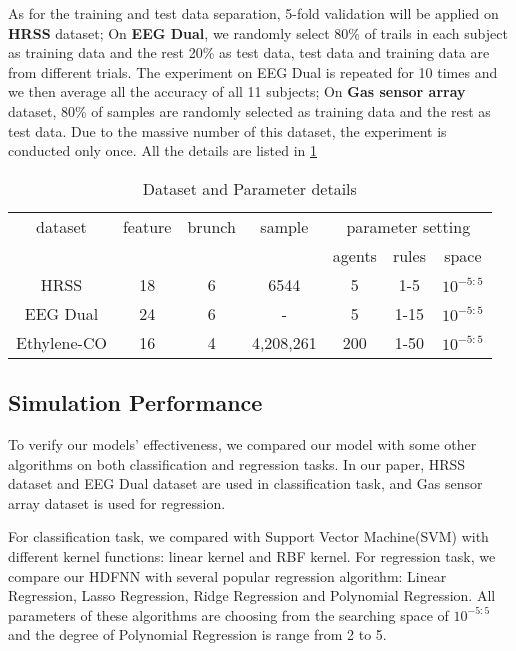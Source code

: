 \documentclass[journal,twocolumn,10pt]{IEEEtran}
\begin{document}
As for the training and test data separation, 5-fold validation will be applied on \textbf{HRSS} dataset; On \textbf{EEG Dual}, we randomly select 80\% of trails in each subject as training data and the rest 20\% as test data, test data and training data are from different trials. The experiment on EEG Dual is repeated for 10 times and we then average all the accuracy of all 11 subjects; On \textbf{Gas sensor array} dataset, 80\% of samples are randomly selected as training data and the rest as test data. Due to the massive number of this dataset, the experiment is conducted only once. All the details are listed in \ref{tab:para_setting}

\begin{table}[!ht]
  \centering
  {\fontsize{9pt}{10pt}\selectfont
  \vspace{-15pt}
  \caption{Dataset and Parameter details}
  \begin{tabular}{|c|c|c|c|c|c|c|} \hline
  dataset      & feature & brunch & sample    & \multicolumn{3}{|c|}{parameter setting}   \\ \cline{5-7}
               &         &        &           & agents & rules &  space                   \\ \hline
   HRSS        & 18      & 6      & 6544      & 5      & 1-5   & $10^{-5:5}$              \\ \hline
   EEG Dual    & 24      & 6      & -         & 5      & 1-15  & $10^{-5:5}$              \\ \hline
   Ethylene-CO & 16      & 4      & 4,208,261 & 200    & 1-50  & $10^{-5:5}$              \\ \hline
  \end{tabular}}
  \vspace{-10pt}
  \label{tab:para_setting}
\end{table}

\subsection{Simulation Performance}
To verify our models' effectiveness, we compared our model with some other algorithms on both classification and regression tasks. In our paper, HRSS dataset and EEG Dual dataset are used in classification task, and Gas sensor array dataset is used for regression.

For classification task, we compared with Support Vector Machine(SVM) with different kernel functions: linear kernel and RBF kernel. For regression task, we compare our HDFNN with several popular regression algorithm: Linear Regression, Lasso Regression, Ridge Regression and Polynomial Regression. All parameters of these algorithms are choosing from the searching space of $10^{-5:5}$ and the degree of Polynomial Regression is range from 2 to 5.
\end{document}
